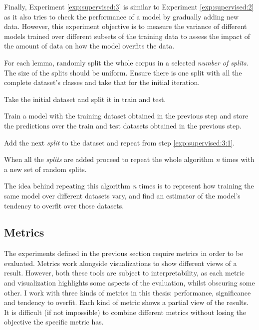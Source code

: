 Finally, Experiment \ref{exp:supervised:3} is similar to Experiment
\ref{exp:supervised:2} as it also tries to check the performance of a model by
gradually adding new data. However, this experiment objective is to measure the
variance of different models trained over different subsets of the training
data to assess the impact of the amount of data on how the model overfits the
data.

\begin{experiment}\label{exp:supervised:3}
  \begin{enumexp}
    \item For each lemma, randomly split the whole corpus in a selected {\em
      number of splits}. The size of the splits should be uniform. Ensure there
      is one split with all the complete dataset's classes and take that for
      the initial iteration.
    \item \label{exp:supervised:3:1} Take the initial dataset and split it in
      train and test.
    \item Train a model with the training dataset obtained in the previous step
      and store the predictions over the train and test datasets obtained in
      the previous step.
    \item Add the next {\em split} to the dataset and repeat from step
      \ref{exp:supervised:3:1}.
    \item When all the {\em splits} are added proceed to repeat the whole
      algorithm {\em n} times with a new set of random splits.
  \end{enumexp}
\end{experiment}

The idea behind repeating this algorithm {\em n} times is to represent how
training the same model over different datasets vary, and find an estimator of
the model's tendency to overfit over those datasets.

\subsection{Metrics}\label{sec:supervised:metrics}

The experiments defined in the previous section require metrics in order to be
evaluated. Metrics work alongside visualizations to show different views of a
result. However, both these tools are subject to interpretability, as each
metric and visualization highlights some aspects of the evaluation, whilst
obscuring some other. I work with three kinds of metrics in this thesis:
performance, significance and tendency to overfit. Each kind of metric shows a
partial view of the results. It is difficult (if not impossible) to combine
different metrics without losing the objective the specific metric has.

